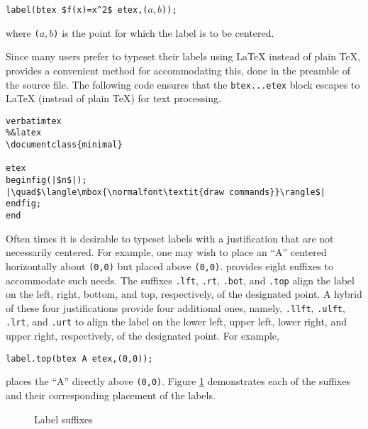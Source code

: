 \begin{center}
  \verb|label(btex $f(x)=x^2$ etex,(|$a,b$\verb|));|
\end{center}

where \verb|(|$a,b$\verb|)| is the point for which the label is to be
centered.

Since many \MP{} users prefer to typeset their labels using \LaTeX{}
instead of plain \TeX, \MP{} provides a convenient method for
accommodating this, done in the preamble of the \MP{} source file.  The
following code ensures that the \verb|btex...etex| block escapes to
\LaTeX{} (instead of plain \TeX) for text processing.

\begin{lstlisting}[xleftmargin=56bp]
verbatimtex
%&latex
\documentclass{minimal}

etex
beginfig(|$n$|);
|\quad$\langle\mbox{\normalfont\textit{draw commands}}\rangle$|
endfig;
end
\end{lstlisting}

Often times it is desirable to typeset labels with a justification that
are not necessarily centered.  For example, one may wish to place an
``A'' centered horizontally about \texttt{(0,0)} but placed above
\texttt{(0,0)}. \MP{} provides eight suffixes to accommodate such needs.
The suffixes \texttt{.lft}, \texttt{.rt}, \texttt{.bot}, and
\texttt{.top} align the label on the left, right, bottom, and top,
respectively, of the designated point.  A hybrid of these four
justifications provide four additional ones, namely, \texttt{.llft},
\texttt{.ulft}, \texttt{.lrt}, and \texttt{.urt} to align the label on
the lower left, upper left, lower right, and upper right, respectively,
of the designated point.  For example,

\begin{center}
  \verb|label.top(btex A etex,(0,0));|
\end{center}

places the ``A'' directly above \texttt{(0,0)}.  Figure \ref{fig:label}
demonstrates each of the suffixes and their corresponding placement of
the labels.

\begin{figure}[hptb]
	\begin{center}
    \hfill%
    \hfill%
    \hfill\mbox{}
  \end{center}
	\caption{Label suffixes}
  \label{fig:label}
\end{figure}
